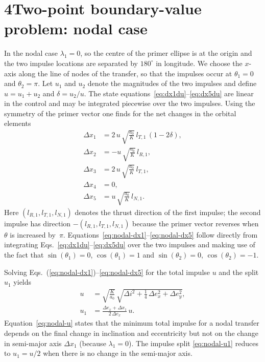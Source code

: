 \documentclass[12pt]{article}
\begin{document}
\section*{4\quad Two-point boundary-value problem: nodal case}

In the nodal case $\lambda_1 = 0$, so the centre of the primer ellipse
is at the origin and the two impulse locations are separated by
$180^\circ$ in longitude.  We choose the $x$-axis along the line of nodes of
the transfer, so that the impulses occur at $\theta_1 = 0$ and
$\theta_2 = \pi$.  Let $u_1$ and $u_2$ denote the magnitudes of the
two impulses and define $u = u_1 + u_2$ and $\delta = u_2/u$.  The
state equations~\eqref{eq:dx1du}--\eqref{eq:dx5du} are linear in the
control and may be integrated piecewise over the two impulses.  Using
the symmetry of the primer vector one finds for the net changes in the
orbital elements
\begin{align}
  \Delta x_1 &= 2\,u\,\sqrt{\frac{a_0}{K}}\,l_{T,1}\,(1-2\delta),
    \tag{A1}\label{eq:nodal-dx1}\\
  \Delta x_2 &= -u\,\sqrt{\frac{a_0}{K}}\,l_{R,1},
    \tag{A2}\label{eq:nodal-dx2}\\
  \Delta x_3 &= 2\,u\,\sqrt{\frac{a_0}{K}}\,l_{T,1},
    \tag{A3}\label{eq:nodal-dx3}\\
  \Delta x_4 &= 0,
    \tag{A4}\label{eq:nodal-dx4}\\
  \Delta x_5 &= u\,\sqrt{\frac{a_0}{K}}\,l_{N,1}.
    \tag{A5}\label{eq:nodal-dx5}
\end{align}
Here $(l_{R,1},l_{T,1},l_{N,1})$ denotes the thrust direction of the
first impulse; the second impulse has direction $-(l_{R,1},l_{T,1},l_{N,1})$ because the primer vector reverses when $\theta$ is increased by~$\pi$.  Equations~\eqref{eq:nodal-dx1}--\eqref{eq:nodal-dx5} follow directly from integrating Eqs.~\eqref{eq:dx1du}--\eqref{eq:dx5du} over the two impulses and making use of the fact that $\sin(\theta_1)=0$, $\cos(\theta_1)=1$ and $\sin(\theta_2)=0$, $\cos(\theta_2)=-1$.

Solving Eqs.~(\ref{eq:nodal-dx1})--\eqref{eq:nodal-dx5} for the total
impulse $u$ and the split $u_1$ yields
\begin{align}
  u &= \sqrt{\frac{K}{a_0}}\,\sqrt{\Delta i^2 + \frac{1}{4}\,\Delta e_x^2 + \Delta e_y^2},
    \tag{A6}\label{eq:nodal-u}\\
  u_1 &= \frac{\Delta e_x + \Delta x_1}{2\,\Delta e_x}\,u.
    \tag{A7}\label{eq:nodal-u1}
\end{align}
Equation~\eqref{eq:nodal-u} states that the minimum total impulse for
a nodal transfer depends on the final change in inclination and
eccentricity but not on the change in semi-major axis $\Delta x_1$
(because $\lambda_1=0$).  The impulse split \eqref{eq:nodal-u1}
reduces to $u_1 = u/2$ when there is no change in the semi-major axis.
\end{document}

